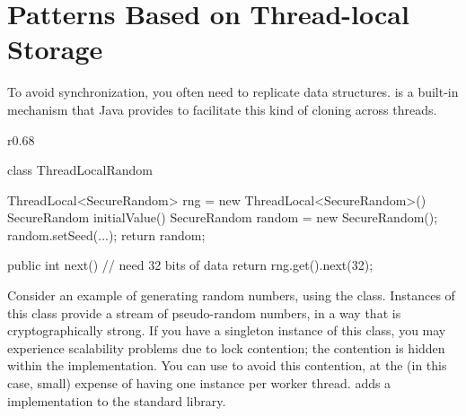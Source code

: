\begin{comment}
Resource pooling only makes sense if the allocations themselves are expensive.
There are several reasons why a Java object can be expensive to allocate.
Creating and zeroing a large array\index{Large Arrays} in each iteration of a
loop can bog down performance. Creating a new key object to determine whether an
value exists in a map can sometimes contribute a great deal to the load of
temporary objects.

\index{Connection Pools}
A more important example of the need for amortizing the time cost of allocation
comes when this Java object is a proxy for resources outside of Java. If your
application accesses a relational database through the JDBC\index{JDBC}
interface, you will experience the need for resource pooling. There are two kinds
of objects that serve as proxies for resources involving database access. First
are the connections to the database. In most operating systems, establishing a
network connection is an expensive proposition. It also involves reservation of
resoures in the database process. Second are the precompiled SQL statements that
your application uses. As with the connections, these involve setup cost, of the
compilation itself, as well as the reservation of memory resources, that the
database uses to cache certain information about the query.
\end{comment}

\section{Patterns Based on Thread-local Storage}

To avoid synchronization, you often need to replicate data structures. \Tls is a
built-in mechanism that Java provides to facilitate this kind of cloning across
threads. 

\begin{wrapfigure}{r}{0.68\textwidth}
\centering
\begin{framedlisting}
class ThreadLocalRandom {
  ThreadLocal<SecureRandom> rng = new ThreadLocal<SecureRandom>() {
    SecureRandom initialValue() {
      SecureRandom random = new SecureRandom();
      random.setSeed(...);
      return random;
    }
  }
   
  public int next() {
    // need 32 bits of data
    return rng.get().next(32);
  }
}
\end{framedlisting}
\end{wrapfigure}
Consider an example of generating random numbers, using the 
class. Instances of this class provide a stream of pseudo-random numbers, in a way that is
cryptographically strong. If you have a singleton instance of this class, you
may experience scalability problems due to lock contention; the contention is
hidden within the  implementation. You can use \tls to avoid
this contention, at the (in this case, small) expense of having one instance per
worker thread. \javaseven adds a  implementation to the
standard library.


